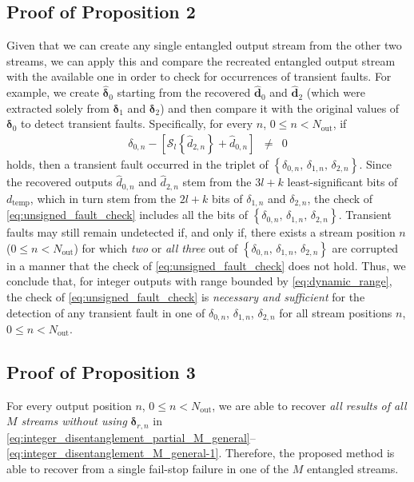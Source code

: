 \documentclass[twocolumn,english,onecolumn]{IEEEtran}
\theoremstyle{plain}
\theoremstyle{plain}
\begin{document}
\subsection{Proof of Proposition 2}
\begin{IEEEproof}
Given that we can create any single entangled output stream from the
other two streams, we can apply this and compare the recreated entangled
output stream with the available one in order to check for occurrences
of transient faults. For example, we create $\boldsymbol{\hat{\delta}}_{0}$
starting from the recovered $\hat{\mathbf{d}}_{0}$ and $\hat{\mathbf{d}}_{2}$
(which were extracted solely from $\boldsymbol{\delta}_{1}$ and $\boldsymbol{\delta}_{2}$)
and then compare it with the original values of $\boldsymbol{\delta}_{0}$
to detect transient faults. Specifically, for every $n$, $0\leq n<N_{\text{out}}$,
if \\
\begin{eqnarray}
\delta_{0,n}-\left[\mathcal{S}_{l}\left\{ \hat{d}_{2,n}\right\} +\hat{d}_{0,n}\right] & \neq & 0\label{eq:unsigned_fault_check}
\end{eqnarray}
holds, then a transient fault occurred in the triplet of $\left\{ \delta_{0,n},\,\delta_{1,n},\,\delta_{2,n}\right\} $.
Since the recovered outputs $\hat{d}_{0,n}$ and $\hat{d}_{2,n}$
stem from the $3l+k$ least-significant bits of $d_{\text{temp}}$,
which in turn stem from the $2l+k$ bits of $\delta_{1,n}$ and $\delta_{2,n}$,
the check of \eqref{eq:unsigned_fault_check} includes all the bits
of $\left\{ \delta_{0,n},\,\delta_{1,n},\,\delta_{2,n}\right\} $.
Transient faults may still remain undetected if, and only if, there
exists a stream position $n$ ($0\leq n<N_{\text{out}}$) for which
\emph{two} or \emph{all three} out of $\left\{ \delta_{0,n},\,\delta_{1,n},\,\delta_{2,n}\right\} $
are corrupted in a manner that the check of \eqref{eq:unsigned_fault_check}
does not hold. Thus, we conclude that, for integer outputs with range
bounded by \eqref{eq:dynamic_range}, the check of \eqref{eq:unsigned_fault_check}
is \emph{necessary and sufficient} for the detection of any transient
fault in one of $\delta_{0,n}$, $\delta_{1,n}$, $\delta_{2,n}$
for all stream positions $n$, $0\leq n<N_{\text{out}}$.
\end{IEEEproof}

\subsection{Proof of Proposition 3}
\begin{IEEEproof}
For every output position $n$, $0\leq n<N_{\text{out}}$, we are
able to recover \emph{all results of all $M$ streams without using}
$\mathrm{\mathbf{\delta}}_{r,n}$ in \eqref{eq:integer_disentanglement_partial_M_general}--\eqref{eq:integer_disentanglement_M_general-1}.
Therefore, the proposed method is able to recover from a single fail-stop
failure in one of the $M$ entangled streams. 
\end{IEEEproof}
\end{document}
